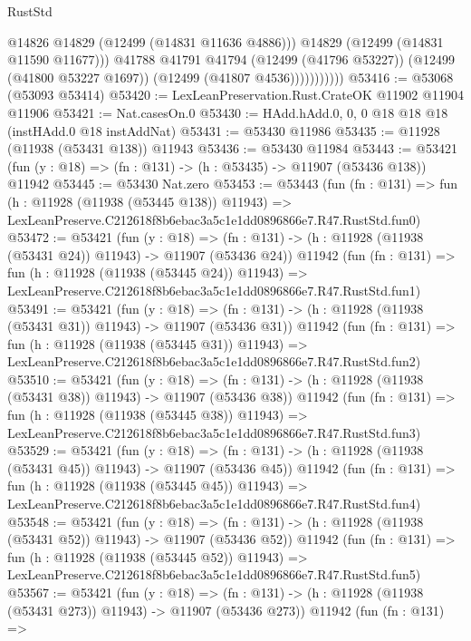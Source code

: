 \begin{lexlean}{RustStd}
\begin{coremodule}
                          @14826
                          @14829
                          (@12499 (@14831 @11636 @4886)))
                        @14829
                        (@12499 (@14831 @11590 @11677)))
                      @41788
                      @41791
                      @41794
                      (@12499 (@41796 @53227))
                      (@12499 (@41800 @53227 @1697))
                      (@12499 (@41807 @4536)))))))))))
@53416 := @53068 (@53093 @53414)
@53420 := LexLeanPreservation.Rust.CrateOK @11902 @11904 @11906
@53421 := Nat.casesOn.{0}
@53430 := HAdd.hAdd.{0, 0, 0} @18 @18 @18 (instHAdd.{0} @18 instAddNat)
@53431 := @53430 @11986
@53435 := @11928 (@11938 (@53431 @138)) @11943
@53436 := @53430 @11984
@53443 := @53421 (fun (y : @18) => (fn : @131) -> (h : @53435) -> @11907 (@53436 @138)) @11942
@53445 := @53430 Nat.zero
@53453 := @53443
    (fun (fn : @131) =>
    fun (h : @11928 (@11938 (@53445 @138)) @11943) =>
    LexLeanPreserve.C212618f8b6ebac3a5c1e1dd0896866e7.R47.RustStd.fun0)
@53472 := @53421
    (fun (y : @18) =>
    (fn : @131) -> (h : @11928 (@11938 (@53431 @24)) @11943) -> @11907 (@53436 @24))
    @11942
    (fun (fn : @131) =>
    fun (h : @11928 (@11938 (@53445 @24)) @11943) =>
    LexLeanPreserve.C212618f8b6ebac3a5c1e1dd0896866e7.R47.RustStd.fun1)
@53491 := @53421
    (fun (y : @18) =>
    (fn : @131) -> (h : @11928 (@11938 (@53431 @31)) @11943) -> @11907 (@53436 @31))
    @11942
    (fun (fn : @131) =>
    fun (h : @11928 (@11938 (@53445 @31)) @11943) =>
    LexLeanPreserve.C212618f8b6ebac3a5c1e1dd0896866e7.R47.RustStd.fun2)
@53510 := @53421
    (fun (y : @18) =>
    (fn : @131) -> (h : @11928 (@11938 (@53431 @38)) @11943) -> @11907 (@53436 @38))
    @11942
    (fun (fn : @131) =>
    fun (h : @11928 (@11938 (@53445 @38)) @11943) =>
    LexLeanPreserve.C212618f8b6ebac3a5c1e1dd0896866e7.R47.RustStd.fun3)
@53529 := @53421
    (fun (y : @18) =>
    (fn : @131) -> (h : @11928 (@11938 (@53431 @45)) @11943) -> @11907 (@53436 @45))
    @11942
    (fun (fn : @131) =>
    fun (h : @11928 (@11938 (@53445 @45)) @11943) =>
    LexLeanPreserve.C212618f8b6ebac3a5c1e1dd0896866e7.R47.RustStd.fun4)
@53548 := @53421
    (fun (y : @18) =>
    (fn : @131) -> (h : @11928 (@11938 (@53431 @52)) @11943) -> @11907 (@53436 @52))
    @11942
    (fun (fn : @131) =>
    fun (h : @11928 (@11938 (@53445 @52)) @11943) =>
    LexLeanPreserve.C212618f8b6ebac3a5c1e1dd0896866e7.R47.RustStd.fun5)
@53567 := @53421
    (fun (y : @18) =>
    (fn : @131) -> (h : @11928 (@11938 (@53431 @273)) @11943) -> @11907 (@53436 @273))
    @11942
    (fun (fn : @131) =>

\end{coremodule}
\end{lexlean}
